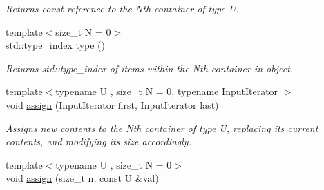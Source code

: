 \begin{DoxyCompactItemize}
\begin{DoxyCompactList}\small\item\em Returns const reference to the Nth container of type U. \end{DoxyCompactList}\item 
\hypertarget{classheterogeneous_1_1heteroforward__list_3_01_t_00_01_types_8_8_8_4_a029a07c8e653c56144a47baf80b945f9}{}{\footnotesize template$<$size\+\_\+t N = 0$>$ }\\std\+::type\+\_\+index \hyperlink{classheterogeneous_1_1heteroforward__list_3_01_t_00_01_types_8_8_8_4_a029a07c8e653c56144a47baf80b945f9}{type} ()\label{classheterogeneous_1_1heteroforward__list_3_01_t_00_01_types_8_8_8_4_a029a07c8e653c56144a47baf80b945f9}

\begin{DoxyCompactList}\small\item\em Returns std\+::type\+\_\+index of items within the Nth container in object. \end{DoxyCompactList}\item 
\hypertarget{classheterogeneous_1_1heteroforward__list_3_01_t_00_01_types_8_8_8_4_a856787a7acaf5a434ad1524842cc7513}{}{\footnotesize template$<$typename U , size\+\_\+t N = 0, typename Input\+Iterator $>$ }\\void \hyperlink{classheterogeneous_1_1heteroforward__list_3_01_t_00_01_types_8_8_8_4_a856787a7acaf5a434ad1524842cc7513}{assign} (Input\+Iterator first, Input\+Iterator last)\label{classheterogeneous_1_1heteroforward__list_3_01_t_00_01_types_8_8_8_4_a856787a7acaf5a434ad1524842cc7513}

\begin{DoxyCompactList}\small\item\em Assigns new contents to the Nth container of type U, replacing its current contents, and modifying its size accordingly. \end{DoxyCompactList}\item 
\hypertarget{classheterogeneous_1_1heteroforward__list_3_01_t_00_01_types_8_8_8_4_ab0fc45d5c2e78597a8e3f9539b90fe9e}{}{\footnotesize template$<$typename U , size\+\_\+t N = 0$>$ }\\void \hyperlink{classheterogeneous_1_1heteroforward__list_3_01_t_00_01_types_8_8_8_4_ab0fc45d5c2e78597a8e3f9539b90fe9e}{assign} (size\+\_\+t n, const U \&val)\label{classheterogeneous_1_1heteroforward__list_3_01_t_00_01_types_8_8_8_4_ab0fc45d5c2e78597a8e3f9539b90fe9e}


\end{DoxyCompactItemize}
